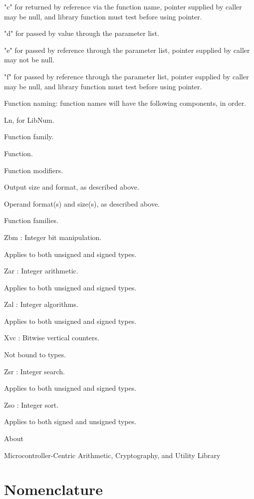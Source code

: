 "c" for returned by reference via the function name, pointer supplied
by caller may be null, and library function must test before using pointer.

"d" for passed by value through the parameter list.

"e" for passed by reference through the parameter list, pointer supplied
by caller may not be null.

"f" for passed by reference through the parameter list, pointer supplied
by caller may be null, and library function must test before using pointer.

Function naming: function names will have the following components, in order.

Ln, for LibNum.

Function family.

Function.

Function modifiers.

Output size and format, as described above.

Operand format(s) and size(s), as described above.

Function families.

Zbm : Integer bit manipulation.

Applies to both unsigned and signed types.

Zar : Integer arithmetic.

Applies to both unsigned and signed types.

Zal : Integer algorithms.

Applies to both unsigned and signed types.

Xvc : Bitwise vertical counters.

Not bound to types.

Zsr : Integer search.

Applies to both unsigned and signed types.

Zso : Integer sort.

Applies to both signed and unsigned types.

About

Microcontroller-Centric Arithmetic, Cryptography, and Utility Library


\section{Nomenclature}
\label{cldd0:snom0}

